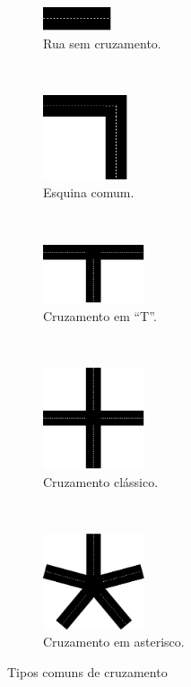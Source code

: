 \begin{figure}[t!]
	\centering
	\begin{subfigure}[t]{0.4\textwidth}
		\centering
		\includegraphics[width=2cm]{./figuras/esquinas1.png} %
		\caption{Rua sem cruzamento.}
		\label{fig_esquinas1}
	\end{subfigure}%
	~
	\begin{subfigure}[t]{0.4\textwidth}
		\centering
		\includegraphics[width=2.5cm]{./figuras/esquinas2.png} %
	\caption{Esquina comum.}
	\label{fig_esquinas2}
	\end{subfigure}
	~
	\begin{subfigure}[t]{0.4\textwidth}
		\centering
		\includegraphics[width=3cm]{./figuras/esquinas3.png} %
	\caption{Cruzamento em ``T''.}
	\label{fig_esquinas3}
	\end{subfigure}
	~
	\begin{subfigure}[t]{0.4\textwidth}
		\centering
		\includegraphics[width=3cm]{./figuras/esquinas4.png} %
	\caption{Cruzamento clássico.}
	\label{fig_esquinas4}
	\end{subfigure}
	~
	\begin{subfigure}[t]{0.4\textwidth}
		\centering
		\includegraphics[width=3cm]{./figuras/esquinas5.png} %
	\caption{Cruzamento em asterisco.}
	\label{fig_esquinas5}
	\end{subfigure}
	\caption{Tipos comuns de cruzamento}
	\label{fig_esquinas}
\end{figure}

